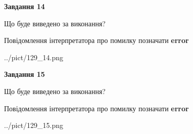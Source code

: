 \documentclass[11pt, ukrainian]{article}
\begin{document}
{\begin {large}
{\begin {center}\textbf{Завдання 14}\end {center}}\par
Що буде виведено за виконання? \par
Повідомлення інтерпретатора про помилку позначати \textbf{error}

\begin{center}
	{../pict/129_14.png}
\end{center}
\newpage

{\begin {center}\textbf{Завдання 15}\end {center}}\par
Що буде виведено за виконання? \par
Повідомлення інтерпретатора про помилку позначати \textbf{error}

\begin{center}
	{../pict/129_15.png}
\end{center}
\newpage

\end {large}}
\end{document}
